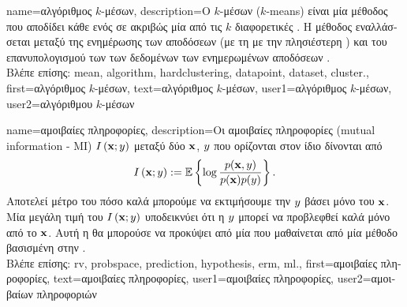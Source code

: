 {name={\foreignlanguage{greek}{αλγόριθμος $k$-μέσων}}, 
	description={\foreignlanguage{greek}{Ο} 
		 $k$-\foreignlanguage{greek}{μέσων} 
		($k$-means) \foreignlanguage{greek}{είναι μία μέθοδος}  \foreignlanguage{greek}{που αποδίδει κάθε} 
		 \foreignlanguage{greek}{ενός}  
		\foreignlanguage{greek}{σε ακριβώς μία από τις $k$ διαφορετικές} . \foreignlanguage{greek}{Η μέθοδος εναλλάσσεται
		μεταξύ της ενημέρωσης των αποδόσεων}  
		\foreignlanguage{greek}{(με τη}  \foreignlanguage{greek}{με την πλησιέστερη} ) 
		\foreignlanguage{greek}{και του επανυπολογισμού των}  \foreignlanguage{greek}{των} 
		 \foreignlanguage{greek}{δεδομένων των ενημερωμένων αποδόσεων}  
		\cite[\foreignlanguage{greek}{Κεφ.} 8]{MLBasics}. \\
		\foreignlanguage{greek}{Βλέπε επίσης:} \gls{mean}, \gls{algorithm}, \gls{hardclustering}, \gls{datapoint}, \gls{dataset}, \gls{cluster}.},
	first={\foreignlanguage{greek}{αλγόριθμος $k$-μέσων}},
	text={\foreignlanguage{greek}{αλγόριθμος $k$-μέσων}},
	user1={\foreignlanguage{greek}{αλγόριθμος $k$-μέσων}}, %
	user2={\foreignlanguage{greek}{αλγόριθμου $k$-μέσων}} %
}

{name={\foreignlanguage{greek}{αμοιβαίες πληροφορίες}},
	description={\foreignlanguage{greek}{Οι} 
		\foreignlanguage{greek}{αμοιβαίες πληροφορίες} (mutual information - MI) $I \left( {\bf x};y\right)$ 
 		\foreignlanguage{greek}{μεταξύ δύο}  ${\bf x}$, $y$ \foreignlanguage{greek}{που ορίζονται στον ίδιο} 
		 \foreignlanguage{greek}{δίνονται από}
 		\cite{coverthomas} $$I \left( {\bf x};y\right) := 
		\mathbb{E} \left\{ \log \frac{p ({\bf x},y)}{p({\bf x})p(y)} \right\}.$$ 
		\foreignlanguage{greek}{Αποτελεί μέτρο του πόσο καλά μπορούμε να εκτιμήσουμε την} $y$ \foreignlanguage{greek}{βάσει 
		μόνο του} ${\bf x}$. \foreignlanguage{greek}{Μία μεγάλη τιμή του} $I \left( {\bf x};y\right)$ 
		\foreignlanguage{greek}{υποδεικνύει ότι η} $y$ \foreignlanguage{greek}{μπο\-ρεί να προβλεφθεί καλά μόνο από το} ${\bf x}$. 
		\foreignlanguage{greek}{Αυτή η}  \foreignlanguage{greek}{θα μπορούσε να προκύψει από μία} 
		 \foreignlanguage{greek}{που μαθαίνεται από μία μέθοδο}  
		\foreignlanguage{greek}{βασισμένη στην} .\\
		\foreignlanguage{greek}{Βλέπε επίσης:} \gls{rv}, \gls{probspace}, \gls{prediction}, \gls{hypothesis}, \gls{erm}, \gls{ml}.}, 
	first={\foreignlanguage{greek}{αμοιβαίες πληροφορίες}}, 
	text={\foreignlanguage{greek}{αμοιβαίες πληροφορίες}},
	user1={\foreignlanguage{greek}{αμοιβαίες πληροφορίες}}, %
	user2={\foreignlanguage{greek}{αμοιβαίων πληροφοριών}} %
}
        
